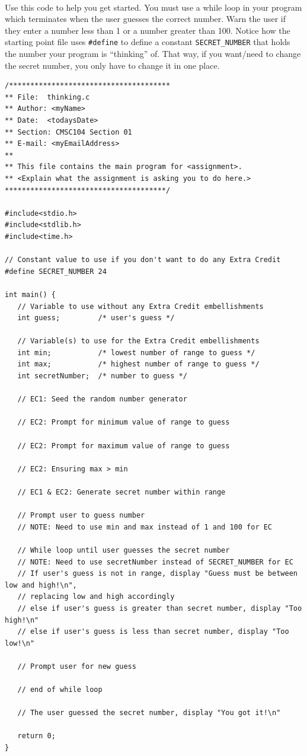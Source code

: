 \documentclass[letter,11pt]{article}
\begin{document}
\paragraph{}Use this code to help you get started. You must use a while loop in your program which terminates when the user guesses the correct number. Warn the user if they enter a number less than 1 or a number greater than 100. Notice how the starting point file uses \texttt{\#define} to define a constant \texttt{SECRET\_NUMBER} that holds the number your program is ``thinking'' of. That way, if you want/need to change the secret number, you only have to change it in one place.
\begin{verbatim}
/**************************************
** File:  thinking.c
** Author: <myName>
** Date:  <todaysDate>
** Section: CMSC104 Section 01
** E-mail: <myEmailAddress>
**
** This file contains the main program for <assignment>.
** <Explain what the assignment is asking you to do here.>
**************************************/

#include<stdio.h>
#include<stdlib.h>
#include<time.h>

// Constant value to use if you don't want to do any Extra Credit
#define SECRET_NUMBER 24

int main() {
   // Variable to use without any Extra Credit embellishments
   int guess;         /* user's guess */

   // Variable(s) to use for the Extra Credit embellishments
   int min;           /* lowest number of range to guess */
   int max;           /* highest number of range to guess */
   int secretNumber;  /* number to guess */

   // EC1: Seed the random number generator

   // EC2: Prompt for minimum value of range to guess

   // EC2: Prompt for maximum value of range to guess
   
   // EC2: Ensuring max > min

   // EC1 & EC2: Generate secret number within range

   // Prompt user to guess number
   // NOTE: Need to use min and max instead of 1 and 100 for EC

   // While loop until user guesses the secret number
   // NOTE: Need to use secretNumber instead of SECRET_NUMBER for EC
   // If user's guess is not in range, display "Guess must be between low and high!\n",
   // replacing low and high accordingly
   // else if user's guess is greater than secret number, display "Too high!\n"
   // else if user's guess is less than secret number, display "Too low!\n"
      
   // Prompt user for new guess
      
   // end of while loop
   
   // The user guessed the secret number, display "You got it!\n"

   return 0;
}
\end{verbatim}
\end{document}
